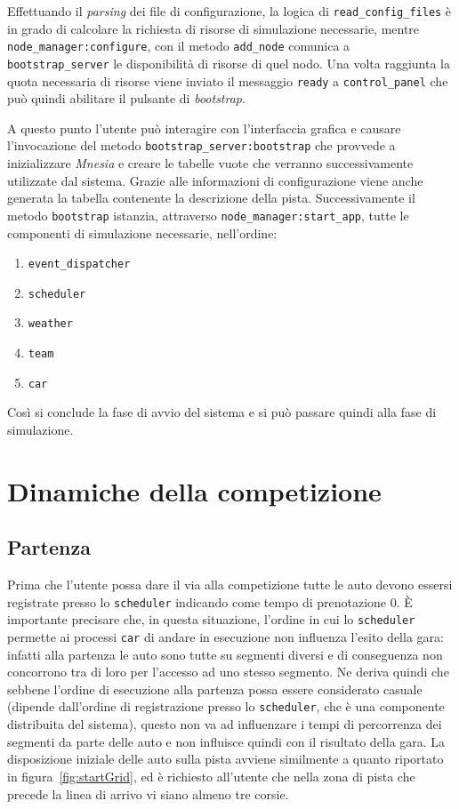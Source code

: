 \documentclass[a4paper]{report}
\newcommand{\fun}[1]{\texttt{#1}}
\begin{document}
Effettuando il \textit{parsing} dei file di configurazione, la logica di \fun{read\_config\_files} è in grado di calcolare la richiesta di risorse di simulazione necessarie, mentre \fun{node\_manager:configure}, con il metodo \fun{add\_node} comunica a \texttt{bootstrap\_server} le disponibilità di risorse di quel nodo. Una volta raggiunta la quota necessaria di risorse viene inviato il messaggio \fun{ready} a \texttt{control\_panel} che può quindi abilitare il pulsante di \textit{bootstrap}.

A questo punto l'utente può interagire con l'interfaccia grafica e causare l'invocazione del metodo \fun{bootstrap\_server:bootstrap} che provvede a inizializzare \textsl{Mnesia} e creare le tabelle vuote che verranno successivamente utilizzate dal sistema. Grazie alle informazioni di configurazione viene anche generata la tabella contenente la descrizione della pista. Successivamente il metodo \fun{bootstrap} istanzia, attraverso \fun{node\_manager:start\_app}, tutte le componenti di simulazione necessarie, nell'ordine:
\begin{enumerate}
\item \texttt{event\_dispatcher}
\item \texttt{scheduler}
\item \texttt{weather}
\item \texttt{team}
\item \texttt{car}
\end{enumerate}

Così si conclude la fase di avvio del sistema e si può passare quindi alla fase di simulazione.

\section{Dinamiche della competizione}
\subsection{Partenza}
Prima che l'utente possa dare il via alla competizione tutte le auto devono essersi registrate presso lo \texttt{scheduler} indicando come tempo di prenotazione $0$. \`E importante precisare che, in questa situazione, l'ordine in cui lo \texttt{scheduler} permette ai processi \texttt{car} di andare in esecuzione non influenza l'esito della gara: infatti alla partenza le auto sono tutte su segmenti diversi e di conseguenza non concorrono tra di loro per l'accesso ad uno stesso segmento. Ne deriva quindi che sebbene l'ordine di esecuzione alla partenza possa essere considerato casuale (dipende dall'ordine di registrazione presso lo \texttt{scheduler}, che è una componente distribuita del sistema), questo non va ad influenzare i tempi di percorrenza dei segmenti da parte delle auto e non influisce quindi con il risultato della gara.
La disposizione iniziale delle auto sulla pista avviene similmente a quanto riportato in figura~\ref{fig:startGrid}, ed è richiesto all'utente che nella zona di pista che precede la linea di arrivo vi siano almeno tre corsie.
\end{document}
